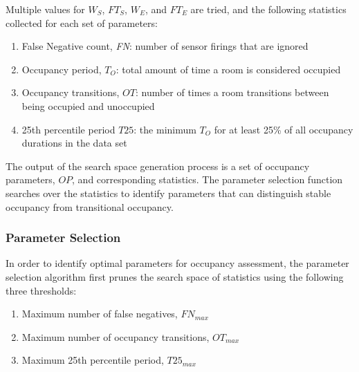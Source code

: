 \begin{figure}[!htb]
\end{figure}

Multiple values for $W_S$, $FT_S$, $W_E$, and $FT_E$ are tried, and the
following statistics collected for each set of parameters:
\begin{enumerate}
\item False Negative count, {\em FN}: number of sensor firings that are ignored 
\item Occupancy period, $T_O$: total amount of time a room is considered occupied
\item Occupancy transitions, $OT$: number of times a room transitions
  between being occupied and unoccupied
\item 25th percentile period $T25$: the minimum $T_O$ for at least 25\% of
  all occupancy durations in the data set 
\end{enumerate}

The output of the search space generation process is a set of occupancy
parameters, $OP$, and corresponding statistics. The parameter selection function
searches over the statistics to identify parameters that can distinguish stable
occupancy from transitional occupancy.

\subsubsection{Parameter Selection}
\label{sec:paramExt}

In order to identify optimal parameters for occupancy assessment, the parameter
selection algorithm first prunes the search space of statistics using the
following three thresholds:
\begin{enumerate}
\item Maximum number of false negatives, $FN_{max}$
\item Maximum number of occupancy transitions, $OT_{max}$
\item Maximum 25th percentile period, $T25_{max}$
\end{enumerate}

